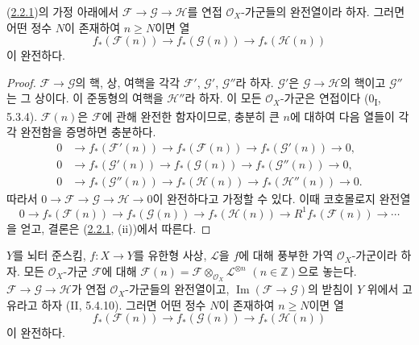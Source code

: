 \begin{corollary}[2.2.3]
\label{III.2.2.3-fr}
(\hyperref[III.2.2.1-fr]{2.2.1})의 가정 아래에서
$\mathcal F\to\mathcal G\to\mathcal H$를 연접
$\mathcal O_X$-가군들의 완전열이라 하자. 그러면 어떤 정수 $N$이
존재하여 $n\geq N$이면 열
\[
f_*(\mathcal F(n))\longrightarrow f_*(\mathcal G(n))
\longrightarrow f_*(\mathcal H(n))
\]
이 완전하다.
\end{corollary}

\begin{proof}
$\mathcal F\to\mathcal G$의 핵, 상, 여핵을 각각
$\mathcal F'$, $\mathcal G'$, $\mathcal G''$라 하자.
$\mathcal G'$은 $\mathcal G\to\mathcal H$의 핵이고
$\mathcal G''$는 그 상이다. 이 준동형의 여핵을 $\mathcal H''$라 하자.
이 모든 $\mathcal O_X$-가군은 연접이다 (0\textsubscript{I}, 5.3.4).
$\mathcal F(n)$은 $\mathcal F$에 관해 완전한 함자이므로, 충분히 큰
$n$에 대하여 다음 열들이 각각 완전함을 증명하면 충분하다.
\begin{align*}
0&\longrightarrow f_*(\mathcal F'(n))
\longrightarrow f_*(\mathcal F(n))
\longrightarrow f_*(\mathcal G'(n))\longrightarrow0,\\
0&\longrightarrow f_*(\mathcal G'(n))
\longrightarrow f_*(\mathcal G(n))
\longrightarrow f_*(\mathcal G''(n))\longrightarrow0,\\
0&\longrightarrow f_*(\mathcal G''(n))
\longrightarrow f_*(\mathcal H(n))
\longrightarrow f_*(\mathcal H''(n))\longrightarrow0.
\end{align*}
따라서 $0\to\mathcal F\to\mathcal G\to\mathcal H\to0$이
완전하다고 가정할 수 있다. 이때 코호몰로지 완전열
\[
0\longrightarrow f_*(\mathcal F(n))
\longrightarrow f_*(\mathcal G(n))
\longrightarrow f_*(\mathcal H(n))
\longrightarrow R^1f_*(\mathcal F(n))\longrightarrow\cdots
\]
을 얻고, 결론은 (\hyperref[III.2.2.1-fr]{2.2.1}, (ii))에서 따른다.
\end{proof}

\begin{corollary}[2.2.4]
\label{III.2.2.4-fr}
$Y$를 뇌터 준스킴, $f:X\to Y$를 유한형 사상,
$\mathcal L$을 $f$에 대해 풍부한 가역 $\mathcal O_X$-가군이라 하자.
모든 $\mathcal O_X$-가군 $\mathcal F$에 대해
$\mathcal F(n)=\mathcal F\otimes_{\mathcal O_X}\mathcal L^{\otimes n}$
$(n\in\mathbb Z)$으로 놓는다. $\mathcal F\to\mathcal G\to\mathcal H$가
연접 $\mathcal O_X$-가군들의 완전열이고,
$\operatorname{Im}(\mathcal F\to\mathcal G)$의 받침이 $Y$ 위에서
고유라고 하자 (II, 5.4.10). 그러면 어떤 정수 $N$이 존재하여
$n\geq N$이면 열
\[
f_*(\mathcal F(n))\longrightarrow f_*(\mathcal G(n))
\longrightarrow f_*(\mathcal H(n))
\]
이 완전하다.
\end{corollary}

